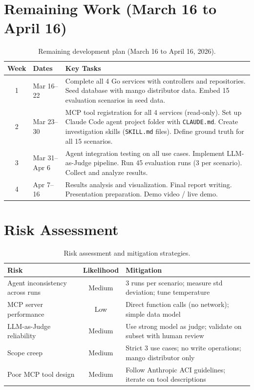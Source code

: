 \documentclass[12pt,a4paper]{report}
\begin{document}
\section{Remaining Work (March 16 to April 16)}

\begin{table}[H]
\centering\small
\caption{Remaining development plan (March 16 to April 16, 2026).}
\begin{tabularx}{\textwidth}{@{} c l X @{}}
\toprule
\textbf{Week} & \textbf{Dates} & \textbf{Key Tasks} \\
\midrule
1 & Mar 16--22 &
    Complete all 4 Go services with controllers and repositories.
    Seed database with mango distributor data.
    Embed 15 evaluation scenarios in seed data. \\
2 & Mar 23--30 &
    MCP tool registration for all 4 services (read-only).
    Set up Claude Code agent project folder with \texttt{CLAUDE.md}.
    Create investigation skills (\texttt{SKILL.md} files).
    Define ground truth for all 15 scenarios. \\
3 & Mar 31--Apr 6 &
    Agent integration testing on all use cases.
    Implement LLM-as-Judge pipeline.
    Run 45 evaluation runs (3 per scenario).
    Collect and analyze results. \\
4 & Apr 7--16 &
    Results analysis and visualization.
    Final report writing.
    Presentation preparation.
    Demo video / live demo. \\
\bottomrule
\end{tabularx}
\end{table}

\section{Risk Assessment}

\begin{table}[H]
\centering\small
\caption{Risk assessment and mitigation strategies.}
\begin{tabularx}{\textwidth}{@{} L{3.5cm} c X @{}}
\toprule
\textbf{Risk} & \textbf{Likelihood} & \textbf{Mitigation} \\
\midrule
Agent inconsistency across runs & Medium & 3 runs per scenario; measure std deviation; tune temperature \\
MCP server performance  & Low & Direct function calls (no network); simple data model \\
LLM-as-Judge reliability & Medium & Use strong model as judge; validate on subset with human review \\
Scope creep             & Medium & Strict 3 use cases; no write operations; mango distributor only \\
Poor MCP tool design    & Medium & Follow Anthropic ACI guidelines; iterate on tool descriptions \\
\bottomrule
\end{tabularx}
\end{table}
\end{document}

